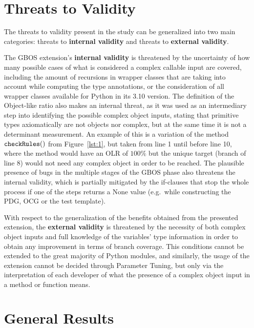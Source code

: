 \documentclass[%
  chapterprefix=false,%
  open=right,%
  twoside=true,%
  paper=a4,%
  logofile={Figures/logo.png},%
  thesistype=master,%
  UKenglish,%
]{se2thesis}
\newcommand{\callable}[2][]{\(\text{\texttt{#2}}(#1)\)}
\begin{document}
\section{Threats to Validity}

The threats to validity present in the study can be generalized into two main categories: threats to \textbf{internal validity} and threats to \textbf{external validity}.

The GBOS extension's \textbf{internal validity} is threatened by the uncertainty of how many possible cases of what is considered a complex callable input are covered, including the amount of recursions in wrapper classes that are taking into account while computing the type annotations, or the consideration of all wrapper classes available for Python in its 3.10 version.
The definition of the Object-like ratio also makes an internal threat, as it was used as an intermediary step into identifying the possible complex object inputs, stating that primitive types axiomatically are not objects nor complex, but at the same time it is not a determinant measurement.
An example of this is a variation of the method \callable[]{checkRules} from Figure~\ref{lst:1}, but taken from line 1 until before line 10, where the method would have an OLR of \(100\%\) but the unique target (branch of line 8) would not need any complex object in order to be reached.
The plausible presence of bugs in the multiple stages of the GBOS phase also threatens the internal validity, which is partially mitigated by the if-clauses that stop the whole process if one of the steps returns a None value (e.g.\ while constructing the PDG, OCG or the test template).

With respect to the generalization of the benefits obtained from the presented extension, the \textbf{external validity} is threatened by the necessity of both complex object inputs and full knowledge of the variables' type information in order to obtain any improvement in terms of branch coverage.
This conditions cannot be extended to the great majority of Python modules, and similarly, the usage of the extension cannot be decided through Parameter Tuning, but only via the interpretation of each developer of what the presence of a complex object input in a method or function means.

\newpage

\section{General Results}
\end{document}
